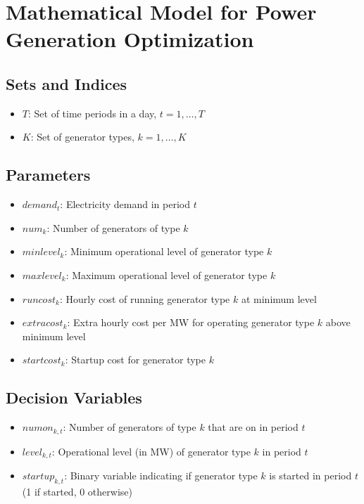 \documentclass{article}
\begin{document}
\section*{Mathematical Model for Power Generation Optimization}

\subsection*{Sets and Indices}
\begin{itemize}
    \item \( T \): Set of time periods in a day, \( t = 1, \ldots, T \)
    \item \( K \): Set of generator types, \( k = 1, \ldots, K \)
\end{itemize}

\subsection*{Parameters}
\begin{itemize}
    \item \( demand_t \): Electricity demand in period \( t \)
    \item \( num_k \): Number of generators of type \( k \)
    \item \( minlevel_k \): Minimum operational level of generator type \( k \)
    \item \( maxlevel_k \): Maximum operational level of generator type \( k \)
    \item \( runcost_k \): Hourly cost of running generator type \( k \) at minimum level
    \item \( extracost_k \): Extra hourly cost per MW for operating generator type \( k \) above minimum level
    \item \( startcost_k \): Startup cost for generator type \( k \)
\end{itemize}

\subsection*{Decision Variables}
\begin{itemize}
    \item \( numon_{k,t} \): Number of generators of type \( k \) that are on in period \( t \)
    \item \( level_{k,t} \): Operational level (in MW) of generator type \( k \) in period \( t \)
    \item \( startup_{k,t} \): Binary variable indicating if generator type \( k \) is started in period \( t \) (1 if started, 0 otherwise)
\end{itemize}
\end{document}
